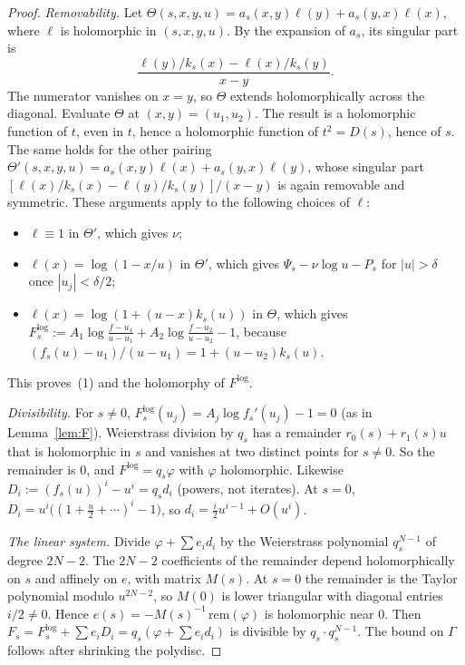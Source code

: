 \documentclass[11pt]{amsart}
\theoremstyle{definition}
\begin{document}
\begin{proof}
\emph{Removability.}  Let $\Theta(s,x,y,u)=a_s(x,y)\ell(y)+a_s(y,x)\ell(x)$,
where $\ell$ is holomorphic in $(s,x,y,u)$.  By the expansion of $a_s$, its
singular part is
\[
 \frac{\ell(y)/k_s(x)-\ell(x)/k_s(y)}{x-y}.
\]
The numerator vanishes on $x=y$, so $\Theta$ extends holomorphically across the
diagonal.  Evaluate $\Theta$ at $(x,y)=(u_1,u_2)$.  The result is a
holomorphic function of $t$, even in $t$, hence a holomorphic function of
$t^2=D(s)$, hence of $s$.  The same holds for the other pairing
$\Theta'(s,x,y,u)=a_s(x,y)\ell(x)+a_s(y,x)\ell(y)$, whose singular part
$[\ell(x)/k_s(x)-\ell(y)/k_s(y)]/(x-y)$ is again removable and symmetric.
These arguments apply to the following choices of $\ell$:
\begin{itemize}
\item $\ell\equiv1$ in $\Theta'$, which gives $\nu$;
\item $\ell(x)=\log(1-x/u)$ in $\Theta'$, which gives $\Psi_s-\nu\log u-P_s$ for
  $|u|>\delta$ once $|u_j|<\delta/2$;
\item $\ell(x)=\log(1+(u-x)k_s(u))$ in $\Theta$, which gives
  $F^{\log}_s:=A_1\log\frac{f-u_1}{u-u_1}+A_2\log\frac{f-u_2}{u-u_2}-1$,
  because $(f_s(u)-u_1)/(u-u_1)=1+(u-u_2)k_s(u)$.
\end{itemize}
This proves~(1) and the holomorphy of $F^{\log}$.

\emph{Divisibility.}  For $s\ne0$, $F^{\log}_s(u_j)=A_j\log f_s'(u_j)-1=0$
(as in Lemma~\ref{lem:F}).  Weierstrass division by $q_s$ has a remainder
$r_0(s)+r_1(s)u$ that is holomorphic in $s$ and vanishes at two distinct points
for $s\ne0$.  So the remainder is $0$, and $F^{\log}=q_s\varphi$ with $\varphi$
holomorphic.  Likewise $D_i:=(f_s(u))^i-u^i=q_s d_i$ (powers, not iterates).  At $s=0$,
$D_i=u^i\bigl((1+\tfrac u2+\cdots)^i-1\bigr)$, so
$d_i=\tfrac i2u^{i-1}+O(u^i)$.

\emph{The linear system.}  Divide $\varphi+\sum e_id_i$ by the Weierstrass
polynomial $q_s^{N-1}$ of degree $2N-2$.  The $2N-2$ coefficients of the
remainder depend holomorphically on $s$ and affinely on $e$, with matrix
$M(s)$.  At $s=0$ the remainder is the Taylor polynomial modulo $u^{2N-2}$, so
$M(0)$ is lower triangular with diagonal entries $i/2\ne0$.  Hence
$e(s)=-M(s)^{-1}\,\mathrm{rem}(\varphi)$ is holomorphic near $0$.  Then
$F_s=F^{\log}_s+\sum e_iD_i=q_s(\varphi+\sum e_id_i)$ is divisible by
$q_s\cdot q_s^{N-1}$.  The bound on $\Gamma$ follows after shrinking the
polydisc.
\end{proof}
\end{document}

